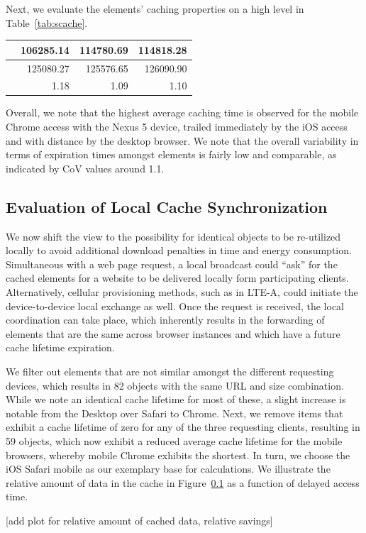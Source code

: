 \documentclass[letterpaper,conference]{IEEEtran}
\begin{document}
Next, we evaluate the elements' caching properties on a high level in Table~\ref{tab:scache}. 
\begin{tabular}{|l|r|r|r|}\hline
& 106285.14	& 114780.69	& 114818.28\\\hline
& 125080.27	& 125576.65	& 126090.90\\\hline
& 1.18	& 1.09	& 1.10\\\hline
\end{tabular}
Overall, we note that the highest average caching time is observed for the mobile Chrome access with the Nexus 5 device, trailed immediately by the iOS access and with distance by the desktop browser.
We note that the overall variability in terms of expiration times amongst elements is fairly low and comparable, as indicated by CoV values around 1.1.

\subsection{Evaluation of Local Cache Synchronization}
We now shift the view to the possibility for identical objects to be re-utilized locally to avoid additional download penalties in time and energy consumption.
Simultaneous with a web page request, a local broadcast could ``ask'' for the cached elements for a website to be delivered locally form participating clients. Alternatively, cellular provisioning methods, such as in LTE-A, could initiate the device-to-device local exchange as well.
Once the request is received, the local coordination can take place, which inherently results in the forwarding of elements that are the same across browser instances and which have a future cache lifetime expiration.

We filter out elements that are not similar amongst the different requesting devices, which results in 82 objects with the same URL and size combination. 
While we note an identical cache lifetime for most of these, a slight increase is notable from the Desktop over Safari to Chrome.  Next, we remove items that exhibit a cache lifetime of zero for any of the three requesting clients, resulting in 59 objects, which now exhibit a reduced average cache lifetime for the mobile browsers, whereby mobile Chrome exhibits the shortest.
In turn, we choose the iOS Safari mobile as our exemplary base for calculations.
We illustrate the relative amount of data in the cache in Figure~\ref{} as a function of delayed access time.

[add plot for relative amount of cached data, relative savings]
\end{document}
